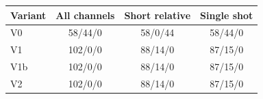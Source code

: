 \begin{tabular}{@{}lccc@{}}\toprule
Variant & All channels & Short relative & Single shot\\
\midrule
V0 & 58/44/0 & 58/0/44 & 58/44/0\\
V1 & 102/0/0 & 88/14/0 & 87/15/0\\
V1b & 102/0/0 & 88/14/0 & 87/15/0\\
V2 & 102/0/0 & 88/14/0 & 87/15/0\\
\bottomrule\end{tabular}

